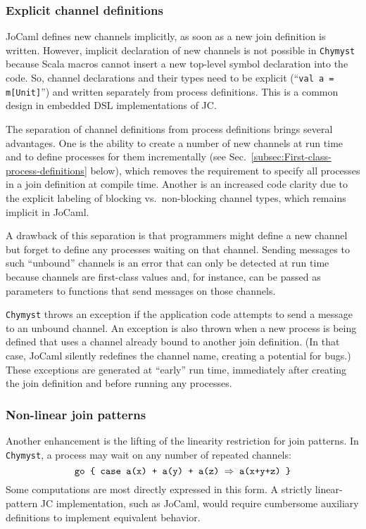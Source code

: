 \documentclass[sigplan,10pt,review,anonymous]{acmart}\settopmatter{printfolios=true}
\begin{document}
\subsubsection{Explicit channel definitions}

JoCaml defines new channels implicitly, as soon as a new join definition
is written. However, implicit declaration of new channels is not possible
in \texttt{Chymyst} because Scala macros cannot insert a new top-level
symbol declaration into the code. So, channel declarations and their
types need to be explicit (``\texttt{val a = m{[}Unit{]}}'') and
written separately from process definitions. This is a common design
in embedded DSL implementations of JC.

The separation of channel definitions from process definitions brings
several advantages. One is the ability to create a number of new channels
at run time and to define processes for them incrementally (see Sec.~\ref{subsec:First-class-process-definitions}
below), which removes the requirement to specify all processes in
a join definition at compile time. Another is an increased code clarity
due to the explicit labeling of blocking vs.~non-blocking channel
types, which remains implicit in JoCaml.

A drawback of this separation is that programmers might define a new
channel but forget to define any processes waiting on that channel.
Sending messages to such ``unbound'' channels is an error that can
only be detected at run time because channels are first-class values
and, for instance, can be passed as parameters to functions that send
messages on those channels. 

\texttt{Chymyst} throws an exception if the application code attempts
to send a message to an unbound channel. An exception is also thrown
when a new process is being defined that uses a channel already bound
to another join definition. (In that case, JoCaml silently redefines
the channel name, creating a potential for bugs.) These exceptions
are generated at ``early'' run time, immediately after creating
the join definition and before running any processes.

\subsubsection{Non-linear join patterns\label{subsec:Non-linear-join-patterns}}

Another enhancement is the lifting of the linearity restriction for
join patterns. In \texttt{Chymyst}, a process may wait on any number
of repeated channels:
\[
\text{\texttt{go \{ case a(x) + a(y) + a(z) \ensuremath{\Rightarrow} a(x+y+z) \}}}
\]
Some computations are most directly
expressed in this form. A strictly linear-pattern JC implementation,
such as JoCaml, would require cumbersome auxiliary definitions to
implement equivalent behavior.
\end{document}

